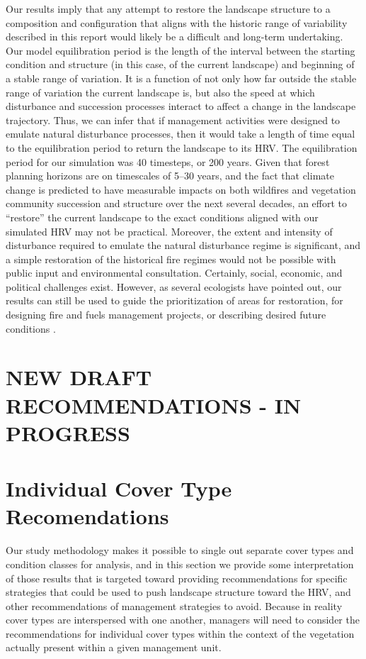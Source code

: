 
Our results imply that any attempt to restore the landscape structure to a composition and configuration that aligns with the historic range of variability described in this report would likely be a difficult and long-term undertaking. Our model equilibration period is the length of the interval between the starting condition and structure (in this case, of the current landscape) and beginning of a stable range of variation. It is a function of not only how far outside the stable range of variation the current landscape is, but also the speed at which disturbance and succession processes interact to affect a change in the landscape trajectory. Thus, we can infer that if management activities were designed to emulate natural disturbance processes, then it would take a length of time equal to the equilibration period to return the landscape to its HRV. The equilibration period for our simulation was 40 timesteps, or 200 years. Given that forest planning horizons are on timescales of 5--30 years, and the fact that climate change is predicted to have measurable impacts on both wildfires and vegetation community succession and structure over the next several decades, an effort to ``restore'' the current landscape to the exact conditions aligned with our simulated HRV may not be practical. Moreover, the extent and intensity of disturbance required to emulate the natural disturbance regime is significant, and a simple restoration of the historical fire regimes would not be possible with public input and environmental consultation. Certainly, social, economic, and political challenges exist. However, as several ecologists have pointed out, our results can still be used to guide the prioritization of areas for restoration, for designing fire and fuels management projects, or describing desired future conditions \citep{Safford2013,Keeley2000}.

\section{ NEW DRAFT RECOMMENDATIONS - IN PROGRESS}
\section{Individual Cover Type Recomendations}
Our study methodology makes it possible to single out separate cover types and condition classes for analysis, and in this section we provide some interpretation of those results that is targeted toward providing recommendations for specific strategies that could be used to push landscape structure toward the HRV, and other recommendations of management strategies to avoid. Because in reality cover types are interspersed with one another, managers will need to consider the recommendations for individual cover types within the context of the vegetation actually present within a given management unit.

